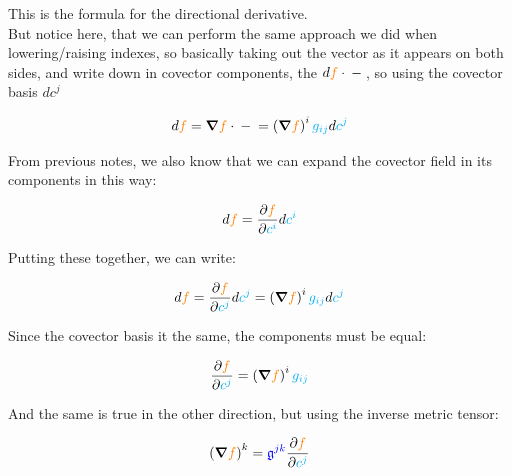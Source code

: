 This is the formula for the directional derivative.\\
But notice here, that we can perform the same approach we did when lowering/raising indexes, so basically taking out 
the vector as it appears on both sides, and write down in covector components, the $d\begingroup\color{orange}{f}\endgroup \cdot {{} - {}}$, so
using the covector basis $dc^j$

\begin{equation} \label{eq:d-components}
    d{\begingroup\color{orange}f\endgroup} = \grad{\begingroup\color{orange}f\endgroup} \cdot {{} - {}} =
    \left(\grad{\begingroup\color{orange}f\endgroup}\right)^i  
    \begingroup\color{cyan}g_{ij}\endgroup d\begingroup\color{cyan}c^j\endgroup
\end{equation}

From previous notes, we also know that we can expand the covector field in its components in this way:

\begin{equation}
    d\begingroup\color{orange}f\endgroup = \frac{\partial \begingroup\color{orange}f\endgroup}{\partial \begingroup\color{cyan}c^i\endgroup} d\begingroup\color{cyan}c^i\endgroup
\end{equation}

Putting these together, we can write:

\begin{equation}
    d\begingroup\color{orange}f\endgroup = \frac{\partial \begingroup\color{orange}f\endgroup}{\partial \begingroup\color{cyan}c^j\endgroup} d\begingroup\color{cyan}c^j\endgroup = 
    \left(\grad{\begingroup\color{orange}f\endgroup}\right)^i  
    \begingroup\color{cyan}g_{ij}\endgroup d\begingroup\color{cyan}c^j\endgroup
\end{equation}

Since the covector basis it the same, the components must be equal:

\begin{equation}
    \frac{\partial \begingroup\color{orange}f\endgroup}{\partial \begingroup\color{cyan}c^j\endgroup} = 
    \left(\grad{\begingroup\color{orange}f\endgroup}\right)^i  
    \begingroup\color{cyan}g_{ij}\endgroup
\end{equation}

And the same is true in the other direction, but using the inverse metric tensor:

\begin{equation}
    \left(\grad{\begingroup\color{orange}f\endgroup}\right)^k =   
    \begingroup\color{blue}\mathfrak{g}^{jk}\endgroup \frac{\partial \begingroup\color{orange}f\endgroup}{\partial \begingroup\color{cyan}c^j\endgroup}
\end{equation}

